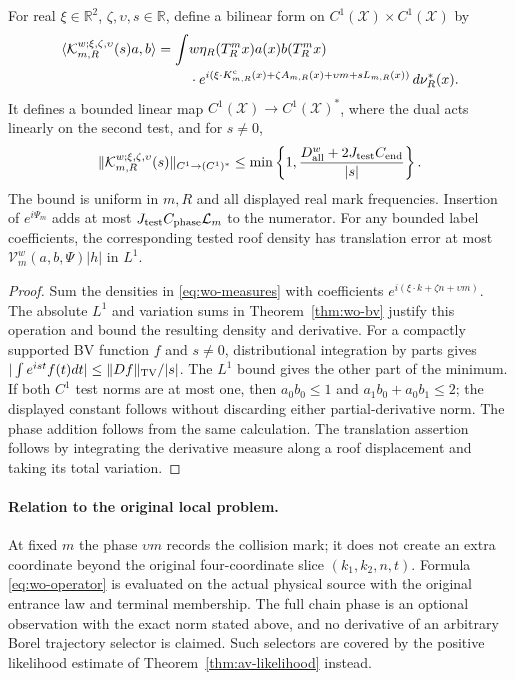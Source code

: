 \begin{corollary}
\label{cor:wo-fourier}
For real $\xi\in\mathbb R^2$, $\zeta,\upsilon,s\in\mathbb R$,
define a bilinear form on $C^1(\mathcal X)\times C^1(\mathcal X)$ by
\begin{equation}\label{eq:wo-operator}
 \begin{split}
 \langle\mathcal K_{m,R}^{w;\xi,\zeta,\upsilon}(s)a,b\rangle
 =\int &w\eta_R(T_R^mx)a(x)b(T_R^mx)\\
 &\cdot e^{i(\xi\cdot K^{\rm c}_{m,R}(x)+
       \zeta A_{m,R}(x)+\upsilon m+sL_{m,R}(x))}
          \,d\nu_R^*(x).
 \end{split}
\end{equation}
It defines a bounded linear map $C^1(\mathcal X)\to C^1(\mathcal X)^*$,
where the dual acts linearly on the second test, and for $s\ne0$,
\begin{equation}\label{eq:wo-weak-bound}
 \|\mathcal K_{m,R}^{w;\xi,\zeta,\upsilon}(s)\|_{C^1\to(C^1)^*}
 \le\min\left\{1,
       \frac{D_{\rm all}^w+2J_{\rm test}C_{\rm end}}{|s|}\right\}.
\end{equation}
The bound is uniform in $m,R$ and all displayed real mark
frequencies.  Insertion of $e^{i\Psi_m}$ adds at most
$J_{\rm test}C_{\rm phase}\mathcal L_m$ to the numerator.
For any bounded label coefficients, the corresponding tested
roof density has translation error at most
$\mathcal V_m^w(a,b,\Psi)|h|$ in $L^1$.
\end{corollary}
\begin{proof}
Sum the densities in \eqref{eq:wo-measures} with coefficients
$e^{i(\xi\cdot k+\zeta n+\upsilon m)}$.  The absolute $L^1$
and variation sums in Theorem~\ref{thm:wo-bv} justify this
operation and bound the resulting density and derivative.
For a compactly supported BV function $f$ and $s\ne0$,
distributional integration by parts gives
$|\int e^{ist}f(t)dt|\le\|Df\|_{\rm TV}/|s|$.
The $L^1$ bound gives the other part of the minimum.
If both $C^1$ test norms are at most one, then
$a_0b_0\le1$ and $a_1b_0+a_0b_1\le2$; the displayed
constant follows without discarding either partial-derivative
norm.  The phase addition follows from the same calculation.
The translation assertion follows by integrating the derivative
measure along a roof displacement and taking its total variation.
\end{proof}

\paragraph{Relation to the original local problem.}
At fixed $m$ the phase $\upsilon m$ records the collision mark;
it does not create an extra coordinate beyond the original
four-coordinate slice $(k_1,k_2,n,t)$.  Formula
\eqref{eq:wo-operator} is evaluated on the actual physical
source with the original entrance law and terminal membership.
The full chain phase is an optional observation with the exact
norm stated above, and no derivative of an arbitrary Borel
trajectory selector is claimed.  Such selectors are covered
by the positive likelihood estimate of
Theorem~\ref{thm:av-likelihood} instead.

